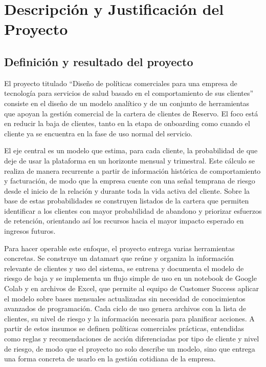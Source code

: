 \section{Descripción y Justificación del Proyecto} 

\subsection{Definición y resultado del proyecto}

El proyecto titulado ``Diseño de políticas comerciales para una empresa de tecnología para servicios de salud basado en el comportamiento de sus clientes'' consiste en el diseño de un modelo analítico y de un conjunto de herramientas que apoyan la gestión comercial de la cartera de clientes de Reservo. El foco está en reducir la baja de clientes, tanto en la etapa de onboarding como cuando el cliente ya se encuentra en la fase de uso normal del servicio.

El eje central es un modelo que estima, para cada cliente, la probabilidad de que deje de usar la plataforma en un horizonte mensual y trimestral. Este cálculo se realiza de manera recurrente a partir de información histórica de comportamiento y facturación, de modo que la empresa cuente con una señal temprana de riesgo desde el inicio de la relación y durante toda la vida activa del cliente. Sobre la base de estas probabilidades se construyen listados de la cartera que permiten identificar a los clientes con mayor probabilidad de abandono y priorizar esfuerzos de retención, orientando así los recursos hacia el mayor impacto esperado en ingresos futuros.

Para hacer operable este enfoque, el proyecto entrega varias herramientas concretas. Se construye un datamart que reúne y organiza la información relevante de clientes y uso del sistema, se entrena y documenta el modelo de riesgo de baja y se implementa un flujo simple de uso en un notebook de Google Colab y en archivos de Excel, que permite al equipo de Customer Success aplicar el modelo sobre bases mensuales actualizadas sin necesidad de conocimientos avanzados de programación. Cada ciclo de uso genera archivos con la lista de clientes, su nivel de riesgo y la información necesaria para planificar acciones. A partir de estos insumos se definen políticas comerciales prácticas, entendidas como reglas y recomendaciones de acción diferenciadas por tipo de cliente y nivel de riesgo, de modo que el proyecto no solo describe un modelo, sino que entrega una forma concreta de usarlo en la gestión cotidiana de la empresa.

